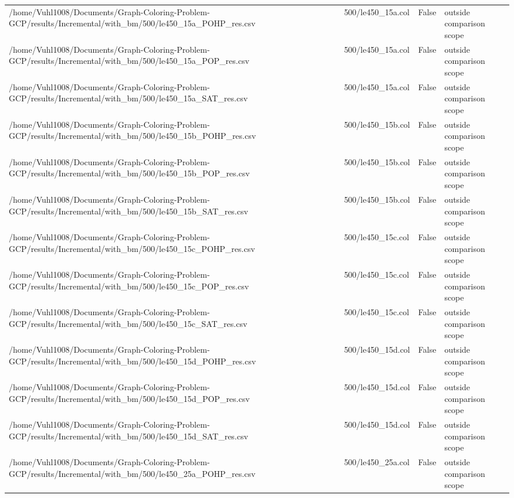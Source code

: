 \begin{table}[htbp]
\begin{tabular}{llll}
/home/Vuhl1008/Documents/Graph-Coloring-Problem-GCP/results/Incremental/with\_bm/500/le450\_15a\_POHP\_res.csv & 500/le450\_15a.col & False & outside comparison scope \\
/home/Vuhl1008/Documents/Graph-Coloring-Problem-GCP/results/Incremental/with\_bm/500/le450\_15a\_POP\_res.csv & 500/le450\_15a.col & False & outside comparison scope \\
/home/Vuhl1008/Documents/Graph-Coloring-Problem-GCP/results/Incremental/with\_bm/500/le450\_15a\_SAT\_res.csv & 500/le450\_15a.col & False & outside comparison scope \\
/home/Vuhl1008/Documents/Graph-Coloring-Problem-GCP/results/Incremental/with\_bm/500/le450\_15b\_POHP\_res.csv & 500/le450\_15b.col & False & outside comparison scope \\
/home/Vuhl1008/Documents/Graph-Coloring-Problem-GCP/results/Incremental/with\_bm/500/le450\_15b\_POP\_res.csv & 500/le450\_15b.col & False & outside comparison scope \\
/home/Vuhl1008/Documents/Graph-Coloring-Problem-GCP/results/Incremental/with\_bm/500/le450\_15b\_SAT\_res.csv & 500/le450\_15b.col & False & outside comparison scope \\
/home/Vuhl1008/Documents/Graph-Coloring-Problem-GCP/results/Incremental/with\_bm/500/le450\_15c\_POHP\_res.csv & 500/le450\_15c.col & False & outside comparison scope \\
/home/Vuhl1008/Documents/Graph-Coloring-Problem-GCP/results/Incremental/with\_bm/500/le450\_15c\_POP\_res.csv & 500/le450\_15c.col & False & outside comparison scope \\
/home/Vuhl1008/Documents/Graph-Coloring-Problem-GCP/results/Incremental/with\_bm/500/le450\_15c\_SAT\_res.csv & 500/le450\_15c.col & False & outside comparison scope \\
/home/Vuhl1008/Documents/Graph-Coloring-Problem-GCP/results/Incremental/with\_bm/500/le450\_15d\_POHP\_res.csv & 500/le450\_15d.col & False & outside comparison scope \\
/home/Vuhl1008/Documents/Graph-Coloring-Problem-GCP/results/Incremental/with\_bm/500/le450\_15d\_POP\_res.csv & 500/le450\_15d.col & False & outside comparison scope \\
/home/Vuhl1008/Documents/Graph-Coloring-Problem-GCP/results/Incremental/with\_bm/500/le450\_15d\_SAT\_res.csv & 500/le450\_15d.col & False & outside comparison scope \\
/home/Vuhl1008/Documents/Graph-Coloring-Problem-GCP/results/Incremental/with\_bm/500/le450\_25a\_POHP\_res.csv & 500/le450\_25a.col & False & outside comparison scope \\

\end{tabular}
\end{table}
